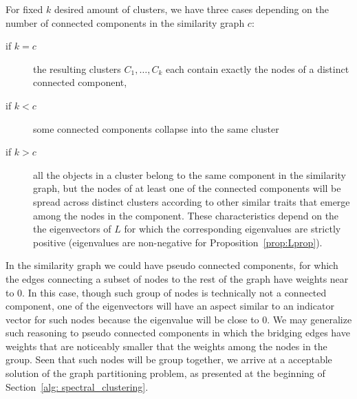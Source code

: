 For fixed $k$ desired amount of clusters, we have three cases depending on the number of connected components in the similarity graph $c$:
\begin{description}
    \item[if \boldmath$k=c$] the resulting clusters $C_1,\dots,C_k$ each contain exactly the nodes of a distinct connected component,
    \item[if \boldmath$k<c$] some connected components collapse into the same cluster
    \item[if \boldmath$k>c$] all the objects in a cluster belong to the same component in the similarity graph, but the nodes of at least one of the connected components will be spread across distinct clusters according to other similar traits that emerge among the nodes in the component. These characteristics depend on the the eigenvectors of $L$ for which the corresponding eigenvalues are strictly positive (eigenvalues are non-negative for Proposition~\ref{prop:Lprop}).
\end{description}
In the similarity graph we could have pseudo connected components, for which the edges connecting a subset of nodes to the rest of the graph have weights near to 0. In this case, though such group of nodes is technically not a connected component, one of the eigenvectors will have an aspect similar to an indicator vector for such nodes because the eigenvalue will be close to 0. We may generalize such reasoning to pseudo connected components in which the bridging edges have weights that are noticeably smaller that the weights among the nodes in the group. Seen that such nodes will be group together, we arrive at a acceptable solution of the graph partitioning problem, as presented at the beginning of Section~\ref{alg: spectral_clustering}.